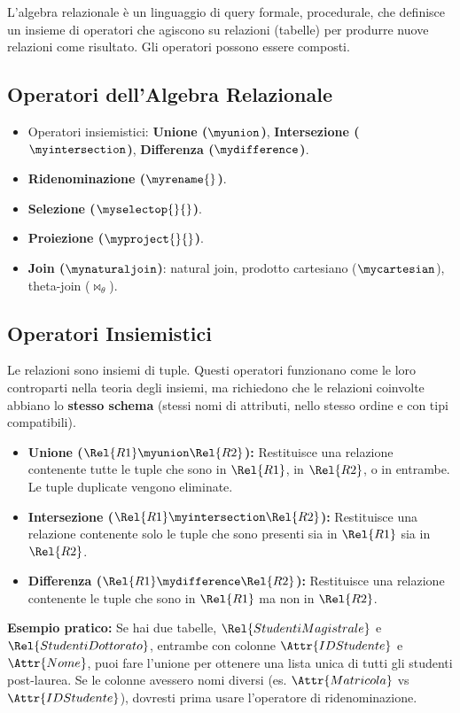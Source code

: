 L'algebra relazionale è un linguaggio di query formale, procedurale, che definisce un insieme di operatori che agiscono su relazioni (tabelle) per produrre nuove relazioni come risultato. Gli operatori possono essere composti.

\subsection{Operatori dell'Algebra Relazionale}
\begin{itemize}
	\item Operatori insiemistici: \textbf{Unione ($\myunion$)}, \textbf{Intersezione ($\myintersection$)}, \textbf{Differenza ($\mydifference$)}.
	\item \textbf{Ridenominazione ($\myrename{}$)}.
	\item \textbf{Selezione ($\myselectop{}{}$)}.
	\item \textbf{Proiezione ($\myproject{}{}$)}.
	\item \textbf{Join ($\mynaturaljoin$)}: natural join, prodotto cartesiano ($\mycartesian$), theta-join ($\bowtie_{\theta}$).
\end{itemize}

\subsection{Operatori Insiemistici}
Le relazioni sono insiemi di tuple. Questi operatori funzionano come le loro controparti nella teoria degli insiemi, ma richiedono che le relazioni coinvolte abbiano lo \textbf{stesso schema} (stessi nomi di attributi, nello stesso ordine e con tipi compatibili).
\begin{itemize}
	\item \textbf{Unione ($\Rel{R1} \myunion \Rel{R2}$):} Restituisce una relazione contenente tutte le tuple che sono in $\Rel{R1}$, in $\Rel{R2}$, o in entrambe. Le tuple duplicate vengono eliminate.
	\item \textbf{Intersezione ($\Rel{R1} \myintersection \Rel{R2}$):} Restituisce una relazione contenente solo le tuple che sono presenti sia in $\Rel{R1}$ sia in $\Rel{R2}$.
	\item \textbf{Differenza ($\Rel{R1} \mydifference \Rel{R2}$):} Restituisce una relazione contenente le tuple che sono in $\Rel{R1}$ ma non in $\Rel{R2}$.
\end{itemize}
\textbf{Esempio pratico:} Se hai due tabelle, $\Rel{StudentiMagistrale}$ e $\Rel{StudentiDottorato}$, entrambe con colonne $\Attr{IDStudente}$ e $\Attr{Nome}$, puoi fare l'unione per ottenere una lista unica di tutti gli studenti post-laurea. Se le colonne avessero nomi diversi (es. $\Attr{Matricola}$ vs $\Attr{IDStudente}$), dovresti prima usare l'operatore di ridenominazione.


